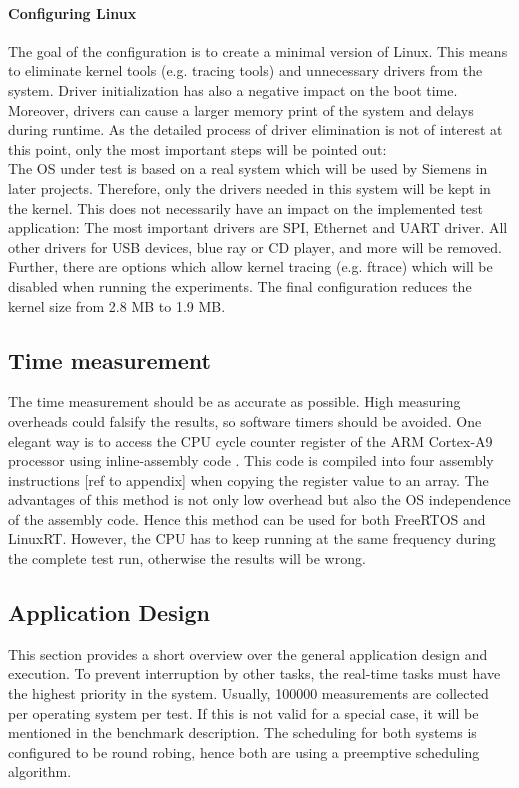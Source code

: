 \paragraph{Configuring Linux}
The goal of the configuration is to create a minimal version of Linux.
This means to eliminate kernel tools (e.g. tracing tools) and unnecessary drivers from the system. 
Driver initialization has also a negative impact on the boot time.
Moreover, drivers can cause a larger memory print of the system and delays during runtime. 
As the detailed process of driver elimination is not of interest at this point, only the most important steps will be pointed out:\\
The \ac{OS} under test is based on a real system which will be used by Siemens in later projects.
Therefore, only the drivers needed in this system will be kept in the kernel.
This does not necessarily have an impact on the implemented test application:
The most important drivers are \ac{SPI}, Ethernet and \ac{UART} driver.
All other drivers for \ac{USB} devices, blue ray or CD player, and more will be removed.
Further, there are options which allow kernel tracing (e.g. ftrace) which will be disabled when running the experiments.  
The final configuration reduces the kernel size from 2.8 MB to 1.9 MB. 

\subsection{Time measurement}
The time measurement should be as accurate as possible.
High measuring overheads could falsify the results, so software timers should be avoided. 
One elegant way is to access the \ac{CPU} cycle counter register of the ARM Cortex-A9 processor using inline-assembly code \cite{arm:aarmaaae}.
This code is compiled into four assembly instructions [ref to appendix] when copying the register value to an array.
The advantages of this method is not only low overhead but also the \ac{OS} independence of the assembly code.
Hence this method can be used for both FreeRTOS and LinuxRT.
However, the \ac{CPU} has to keep running at the same frequency during the complete test run, otherwise the results will be wrong.

\subsection{Application Design}
This section provides a short overview over the general application design and execution.
To prevent interruption by other tasks, the real-time tasks must have the highest priority in the system.
Usually, 100000 measurements are collected per operating system per test.
If this is not valid for a special case, it will be mentioned in the benchmark description.
The scheduling for both systems is configured to be round robing, hence both are using a preemptive scheduling algorithm.
 
